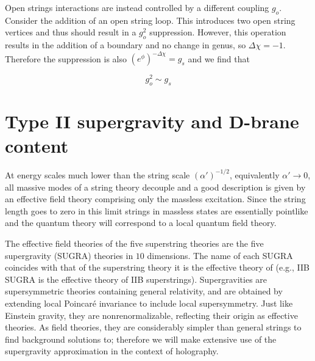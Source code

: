 Open strings interactions are instead controlled by a different coupling $g_o$. Consider the addition of an open string loop. This introduces two open string vertices and thus should result in a $g_o^2$ suppression. However, this operation results in the addition of a boundary and no change in genus, so $\Delta\chi = -1$. Therefore the suppression is also $(e^\phi)^{-\Delta\chi} = g_s$ and we find that

\begin{equation}
	g_o^2 \sim g_s
	\label{}
\end{equation}



\section{Type II supergravity and D-brane content}



At energy scales much lower than the string scale $(\alpha')^{-1/2}$, equivalently $\alpha' \rightarrow 0$, all massive modes of a string theory decouple and a good description is given by an effective field theory comprising only the massless excitation. Since the string length goes to zero in this limit strings in massless states are essentially pointlike and the quantum theory will correspond to a local quantum field theory.

The effective field theories of the five superstring theories are the five supergravity (SUGRA) theories in $10$ dimensions. The name of each SUGRA coincides with that of the superstring theory it is the effective theory of (e.g., IIB SUGRA is the effective theory of IIB superstrings). Supergravities are supersymmetric theories containing general relativity, and are obtained by extending local Poincar\'e invariance to include local supersymmetry. Just like Einstein gravity, they are nonrenormalizable, reflecting their origin as effective theories. As field theories, they are considerably simpler than general strings to find background solutions to; therefore we will make extensive use of the supergravity approximation in the context of holography.

